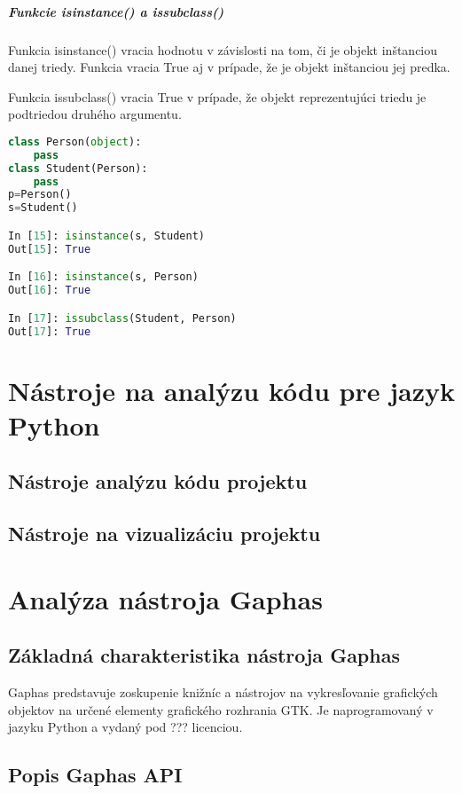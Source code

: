 \documentclass[11pt,oneside,final]{fithesis2}
\begin{document}
		\paragraph{Funkcie isinstance() a issubclass()}
		Funkcia isinstance() vracia hodnotu v závislosti na tom, či je objekt inštanciou danej triedy. Funkcia vracia True aj v prípade, že je objekt inštanciou jej predka.
		
		Funkcia issubclass() vracia True v prípade, že objekt reprezentujúci triedu je podtriedou druhého argumentu.

\begin{lstlisting}[language=python]	
class Person(object):
    pass
class Student(Person):
	pass
p=Person()
s=Student()

In [15]: isinstance(s, Student)
Out[15]: True

In [16]: isinstance(s, Person)
Out[16]: True

In [17]: issubclass(Student, Person)
Out[17]: True
\end{lstlisting}		
			
\chapter{Nástroje na analýzu kódu pre jazyk Python}
	\section{Nástroje analýzu kódu projektu}	
	\section{Nástroje na vizualizáciu projektu}
    
\chapter{Analýza nástroja Gaphas}

	\section{Základná charakteristika nástroja Gaphas}

		Gaphas predstavuje zoskupenie knižníc a nástrojov na vykresľovanie grafických objektov na určené elementy grafického rozhrania GTK. Je naprogramovaný v jazyku Python a vydaný pod ??? licenciou.

	\section{Popis Gaphas API}
\end{document}
